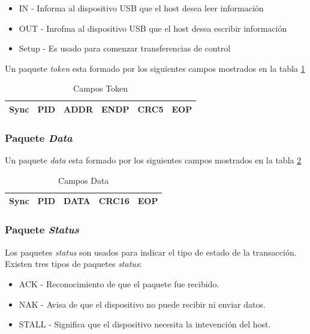 \begin{itemize}
 \item IN - Informa al dispositivo USB que el host desea leer informaci\'on
 \item OUT - Inrofma al dispositivo USB que el host desea escribir
informaci\'on
 \item Setup - Es usado para comenzar transferencias de control
\end{itemize}

Un paquete \emph{token} esta formado por los siguientes campos mostrados en la
tabla \ref{tab:usb_token_fields}


\begin{table}[h]
\centering
\begin{tabular}{|c|c|c|c|c|c|} \hline
Sync & PID & ADDR & ENDP & CRC5 & EOP\\ \hline
\end{tabular}
\caption{Campos Token} 
\label{tab:usb_token_fields}
\end{table}


\subsubsection{Paquete \emph{Data}}
Un paquete \emph{data} esta formado por los siguientes campos mostrados en la
tabla \ref{tab:usb_data_fields}

\begin{table}[h]
\centering
\begin{tabular}{|c|c|c|c|c|} \hline
Sync & PID & DATA & CRC16 & EOP\\ \hline
\end{tabular}
\caption{Campos Data} 
\label{tab:usb_data_fields}
\end{table}


\subsubsection{Paquete \emph{Status}}
Los paquetes \emph{status} son usados para indicar el tipo de estado de la
transacci\'on. Existen tres tipos de paquetes \emph{status}:

\begin{itemize}
 \item ACK - Reconocimiento de que el paquete fue recibido.
 \item NAK - Avisa de que el dispositivo no puede recibir ni enviar datos.
 \item STALL - Significa que el dispositivo necesita la intevenci\'on del host.
\end{itemize}

